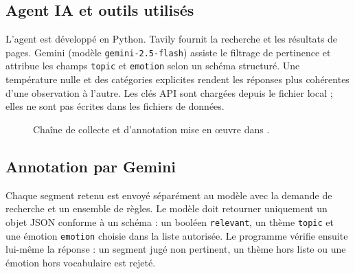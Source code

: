 \documentclass[11pt,a4paper]{article}
\DeclareRobustCommand{\file}[1]{{\small\urlstyle{tt}\path{#1}}}
\begin{document}
\subsection{Agent IA et outils utilisés}
L'agent est développé en Python. Tavily fournit la recherche et les résultats de pages. Gemini (modèle \texttt{gemini-2.5-flash}) assiste le filtrage de pertinence et attribue les champs \texttt{topic} et \texttt{emotion} selon un schéma structuré. Une température nulle et des catégories explicites rendent les réponses plus cohérentes d'une observation à l'autre. Les clés API sont chargées depuis le fichier local \file{AI_agent/.env}; elles ne sont pas écrites dans les fichiers de données.

\begin{figure}[!ht]
\centering
{}
\caption{Chaîne de collecte et d'annotation mise en œuvre dans \file{AI_agent/agent.py}.}
\end{figure}

\subsection{Annotation par Gemini}
Chaque segment retenu est envoyé séparément au modèle avec la demande de recherche et un ensemble de règles. Le modèle doit retourner uniquement un objet JSON conforme à un schéma : un booléen \texttt{relevant}, un thème \texttt{topic} et une émotion \texttt{emotion} choisie dans la liste autorisée. Le programme vérifie ensuite lui-même la réponse : un segment jugé non pertinent, un thème hors liste ou une émotion hors vocabulaire est rejeté.
\end{document}
